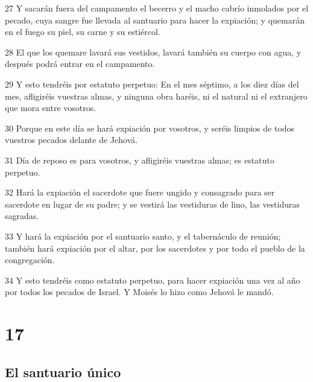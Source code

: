 \par 27 Y sacarán fuera del campamento el becerro y el macho cabrío inmolados por el pecado, cuya sangre fue llevada al santuario para hacer la expiación; y quemarán en el fuego su piel, su carne y su estiércol.
\par 28 El que los quemare lavará sus vestidos, lavará también su cuerpo con agua, y después podrá entrar en el campamento.
\par 29 Y esto tendréis por estatuto perpetuo: En el mes séptimo, a los diez días del mes, afligiréis vuestras almas, y ninguna obra haréis, ni el natural ni el extranjero que mora entre vosotros.
\par 30 Porque en este día se hará expiación por vosotros, y seréis limpios de todos vuestros pecados delante de Jehová.
\par 31 Día de reposo es para vosotros, y afligiréis vuestras almas; es estatuto perpetuo.
\par 32 Hará la expiación el sacerdote que fuere ungido y consagrado para ser sacerdote en lugar de su padre; y se vestirá las vestiduras de lino, las vestiduras sagradas.
\par 33 Y hará la expiación por el santuario santo, y el tabernáculo de reunión; también hará expiación por el altar, por los sacerdotes y por todo el pueblo de la congregación.
\par 34 Y esto tendréis como estatuto perpetuo, para hacer expiación una vez al año por todos los pecados de Israel. Y Moisés lo hizo como Jehová le mandó.

\chapter{17}

\section*{El santuario único}

